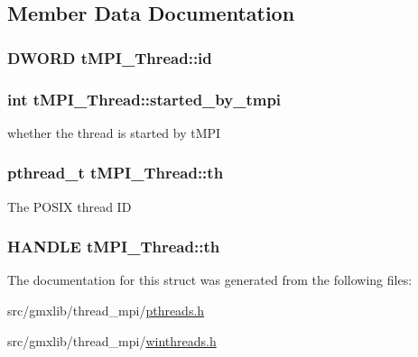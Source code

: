 \subsection{\-Member \-Data \-Documentation}
\hypertarget{structtMPI__Thread_a6d4c76c0c3cd356f34b9cb74a8a87851}{
\subsubsection[{id}]{\setlength{\rightskip}{0pt plus 5cm}\-D\-W\-O\-R\-D {\bf t\-M\-P\-I\-\_\-\-Thread\-::id}}}\label{structtMPI__Thread_a6d4c76c0c3cd356f34b9cb74a8a87851}
\hypertarget{structtMPI__Thread_a50825dcad04a7de6a1c829e1ad56719f}{
\subsubsection[{started\-\_\-by\-\_\-tmpi}]{\setlength{\rightskip}{0pt plus 5cm}int {\bf t\-M\-P\-I\-\_\-\-Thread\-::started\-\_\-by\-\_\-tmpi}}}\label{structtMPI__Thread_a50825dcad04a7de6a1c829e1ad56719f}
whether the thread is started by t\-M\-P\-I \hypertarget{structtMPI__Thread_ae26903de3099795280c1e23e56d13d71}{
\subsubsection[{th}]{\setlength{\rightskip}{0pt plus 5cm}pthread\-\_\-t {\bf t\-M\-P\-I\-\_\-\-Thread\-::th}}}\label{structtMPI__Thread_ae26903de3099795280c1e23e56d13d71}
\-The \-P\-O\-S\-I\-X thread \-I\-D \hypertarget{structtMPI__Thread_a7f106219f558cc6effe6391d82d707ca}{
\subsubsection[{th}]{\setlength{\rightskip}{0pt plus 5cm}\-H\-A\-N\-D\-L\-E {\bf t\-M\-P\-I\-\_\-\-Thread\-::th}}}\label{structtMPI__Thread_a7f106219f558cc6effe6391d82d707ca}


\-The documentation for this struct was generated from the following files\-:\begin{DoxyCompactItemize}
\item 
src/gmxlib/thread\-\_\-mpi/\hyperlink{pthreads_8h}{pthreads.\-h}\item 
src/gmxlib/thread\-\_\-mpi/\hyperlink{winthreads_8h}{winthreads.\-h}\end{DoxyCompactItemize}
